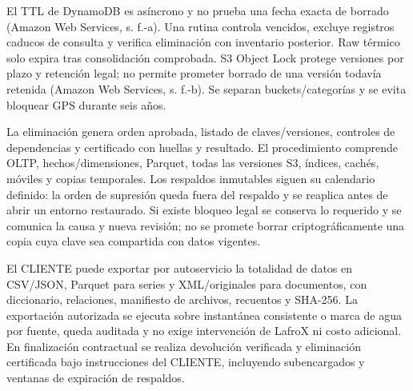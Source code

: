El TTL de DynamoDB es asíncrono y no prueba una fecha exacta de borrado (Amazon Web Services, s. f.-a). Una rutina controla vencidos, excluye registros caducos de consulta y verifica eliminación con inventario posterior. Raw térmico solo expira tras consolidación comprobada. S3 Object Lock protege versiones por plazo y retención legal; no permite prometer borrado de una versión todavía retenida (Amazon Web Services, s. f.-b). Se separan buckets/categorías y se evita bloquear GPS durante seis años.

La eliminación genera orden aprobada, listado de claves/versiones, controles de dependencias y certificado con huellas y resultado. El procedimiento comprende OLTP, hechos/dimensiones, Parquet, todas las versiones S3, índices, cachés, móviles y copias temporales. Los respaldos inmutables siguen su calendario definido: la orden de supresión queda fuera del respaldo y se reaplica antes de abrir un entorno restaurado. Si existe bloqueo legal se conserva lo requerido y se comunica la causa y nueva revisión; no se promete borrar criptográficamente una copia cuya clave sea compartida con datos vigentes.

El CLIENTE puede exportar por autoservicio la totalidad de datos en CSV/JSON, Parquet para series y XML/originales para documentos, con diccionario, relaciones, manifiesto de archivos, recuentos y SHA-256. La exportación autorizada se ejecuta sobre instantánea consistente o marca de agua por fuente, queda auditada y no exige intervención de LafroX ni costo adicional. En finalización contractual se realiza devolución verificada y eliminación certificada bajo instrucciones del CLIENTE, incluyendo subencargados y ventanas de expiración de respaldos.
